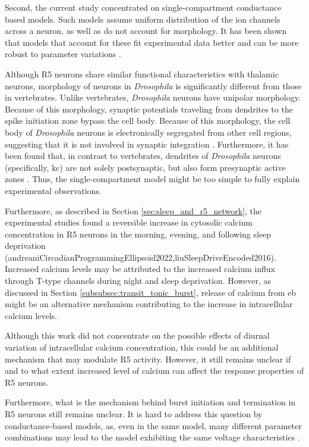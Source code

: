 \documentclass[../main.tex]{subfiles}
\begin{document}
Second, the current study concentrated on single-compartment conductance based models. Such models assume uniform distribution of the ion channels across a neuron, as well as do not account for morphology. It has been shown that models that account for these fit experimental data better and can be more robust to parameter variations \parencite{destexheDendriticLowthresholdCalcium1998}.

Although R5 neurons share similar functional characteristics with thalamic neurons,
morphology of neurons in \textit{Drosophila} is significantly different from those in vertebrates. 
Unlike vertebrates, \textit{Drosophila} neurons have unipolar morphology. Because of this morphology,
synaptic potentials traveling from dendrites to the spike initiation zone bypass the cell body.
Because of this morphology, the cell body of \textit{Drosophila} neurons is
electronically segregated from other cell regions, suggesting that it is not involved
in synaptic integration \parencite{gouwensSignalPropagationDrosophila2009,tuthillLessonsCompartmentalModel2009}.
Furthermore, it has been found that, in contrast to vertebrates, dendrites of
\textit{Drosophila} neurons (specifically, \gls{kc}) are not solely postsynaptic, but
also form presynaptic active zones \parencite{christiansenPresynapsesKenyonCell2011}.
Thus, the single-compartment model might be too simple to fully explain experimental observations.

Furthermore, as described in Section \ref{sec:sleep_and_r5_network}, the experimental studies found a reversible increase in cytosolic calcium concentration in R5 neurons in the morning, evening, and following sleep deprivation (andreaniCircadianProgrammingEllipsoid2022,liuSleepDriveEncoded2016). 
Increased calcium levels may be attributed to the increased calcium influx through T-type channels during night and sleep deprivation. However, as discussed in Section \ref{subsubsec:transit_tonic_burst}, release of calcium from \gls{eb} might be an alternative mechanism contributing to the increase in intracellular calcium levels.

Although this work did not concentrate on the possible effects of diurnal variation of intracellular calcium concentration, this could be an additional mechanism that may modulate R5 activity. However, it still remains unclear if and to what extent increased level of calcium can affect the response properties of R5 neurons.

Furthermore, what is the mechanism behind burst initiation and termination in R5 neurons still remains unclear. It is hard to address this question by conductance-based models, as, even in the same model, many different parameter combinations may lead to the model exhibiting the same voltage characteristics \cite{alonsoVisualizationCurrentsNeural2019, prinzAlternativeHandTuningConductanceBased2003}.
\end{document}
